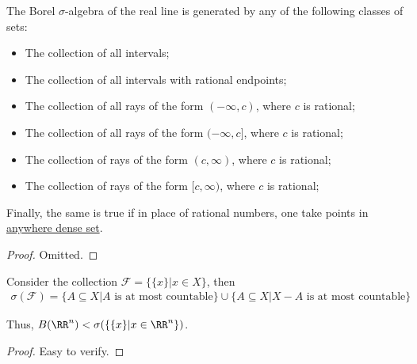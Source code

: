 \documentclass[Total.tex]{subfiles}
\begin{document}
					\begin{proposition}
						The Borel $\sigma$-algebra of the real line is generated by any of the following classes of sets:
						\begin{itemize}
							\item The collection of all intervals;
							\item The collection of all intervals with rational endpoints;
							\item The collection of all rays of the form $(-\infty,c)$, where $c$ is rational;
							\item The collection of all rays of the form $(-\infty,c]$, where $c$ is rational;
							\item The collection of rays of the form $(c,\infty)$, where $c$ is rational;
							\item The collection of rays of the form $[c,\infty)$, where $c$ is rational;
						\end{itemize}
						
						Finally, the same is true if in place of rational numbers, one take points in \underline{anywhere dense set}.
					\end{proposition}
					\begin{proof}
						Omitted. 
					\end{proof}
					
					\begin{proposition}
						Consider the collection $\mathscr{F}=\{\{x\}|x\in X\}$, then
						\begin{gather*}
							\sigma(\mathscr{F})=\{A\subseteq X|A\mbox{ is at most countable}\}\cup \{A\subseteq X|X-A\mbox{ is at most countable}\}
						\end{gather*}
						
						Thus, $B(\RR^n)<\sigma(\{\{x\}|x\in \RR^n\})$.
					\end{proposition}
					\begin{proof}
						Easy to verify.
					\end{proof}
\end{document}
